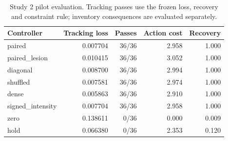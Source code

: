 \begin{table}[htbp]
\centering\small
\begin{tabular}{lrrrr}
\toprule
Controller & Tracking loss & Passes & Action cost & Recovery \\
\midrule
paired & 0.007704 & 36/36 & 2.958 & 1.000 \\
paired\_lesion & 0.010415 & 36/36 & 3.052 & 1.000 \\
diagonal & 0.008700 & 36/36 & 2.994 & 1.000 \\
shuffled & 0.007581 & 36/36 & 2.974 & 1.000 \\
dense & 0.005863 & 36/36 & 2.910 & 1.000 \\
signed\_intensity & 0.007704 & 36/36 & 2.958 & 1.000 \\
zero & 0.138611 & 0/36 & 0.000 & 0.009 \\
hold & 0.066380 & 0/36 & 2.353 & 0.120 \\
\bottomrule
\end{tabular}
\caption{Study 2 pilot evaluation. Tracking passes use the frozen loss, recovery and constraint rule; inventory consequences are evaluated separately.}
\label{tab:study2}
\end{table}
